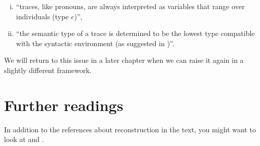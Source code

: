 \begin{enumerate}[(i)] 
\item ``traces, like pronouns, are always interpreted as variables that range
  over individuals (type $e$)'',
\item ``the semantic type of a trace is determined to be the lowest type
  compatible with the syntactic environment (as suggested in
  \cite{beck-1996-diss})''.
\end{enumerate}
%
We will return to this issue in a later chapter when we can raise it again in a
slightly different framework.

\section{Further readings}

In addition to the references about reconstruction in the text, you might want
to look at \cite{boeckx-2001-reconstruction} and \cite{baltin-2010-copy}.



